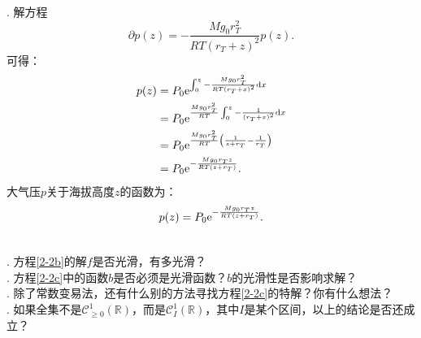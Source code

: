 \documentclass[12pt,UTF8,fontset=none]{ctexbook}
\begin{document}
\begin{so}
    . 解方程
    $$ \partial p(z) = -\frac{Mg_0r_T^2}{RT(r_T + z)^2} p(z). $$
    可得：
    \begin{align*}
        p(z) &= P_0\mathrm{e}^{\int_0^z -\frac{Mg_0r_T^2}{RT(r_T + x)^2}\mathrm{d}x} \\
        &= P_0\mathrm{e}^{\frac{Mg_0r_T^2}{RT}\int_0^z -\frac{1}{(r_T + x)^2}\mathrm{d}x} \\
        &= P_0\mathrm{e}^{\frac{Mg_0r_T^2}{RT}\left(\frac{1}{z + r_T} - \frac{1}{r_T}\right)} \\
        &= P_0\mathrm{e}^{-\frac{Mg_0r_Tz}{RT(z + r_T)}}.
    \end{align*}
    大气压$p$关于海拔高度$z$的函数为：
    $$ p(z) = P_0 \mathrm{e}^{-\frac{Mg_0r_Tz}{RT(z + r_T)}} . $$

\end{so}

\begin{sk}
    \mbox{} \\
    . 方程\eqref{2-2b}的解$f$是否光滑，有多光滑？\\
    . 方程\eqref{2-2c}中的函数$b$是否必须是光滑函数？$b$的光滑性是否影响求解？\\
    . 除了常数变易法，还有什么别的方法寻找方程\eqref{2-2c}的特解？你有什么想法？\\
    . 如果全集不是$\mathcal{C}^1_{\geqslant 0}(\mathbb{R})$，而是$\mathcal{C}^1_I(\mathbb{R})$，其中$I$是某个区间，以上的结论是否还成立？
    
\end{sk}
\end{document}
